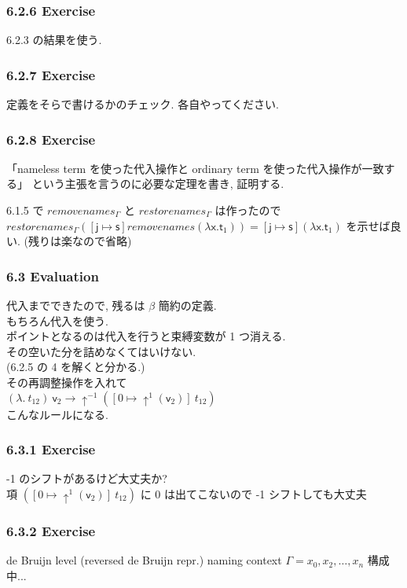\documentclass[13pt,dvipdfm]{beamer}
\begin{document}
\frame
{
  \frametitle{6.2.6 Exercise}
  6.2.3 の結果を使う.
}

\frame
{
  \frametitle{6.2.7 Exercise}
  定義をそらで書けるかのチェック.
  各自やってください.
}

\frame
{
  \frametitle{6.2.8 Exercise}
  「nameless term を使った代入操作と ordinary term を使った代入操作が一致する」
  という主張を言うのに必要な定理を書き, 証明する.

  6.1.5 で $removenames_{\Gamma}$ と $restorenames_{\Gamma}$ は作ったので \\
  $restorenames_{\Gamma}([\mathsf{j} \mapsto \mathsf{s}] removenames(\lambda \mathsf{x}. \mathsf{t}_1)) = [\mathsf{j} \mapsto \mathsf{s}] (\lambda \mathsf{x}. \mathsf{t}_1)$
  を示せば良い. (残りは楽なので省略)
}

\frame
{
  \frametitle{6.3 Evaluation}
  代入までできたので, 残るは $\beta$ 簡約の定義.\\
  もちろん代入を使う.\\
  ポイントとなるのは代入を行うと束縛変数が 1 つ消える.\\
  その空いた分を詰めなくてはいけない.\\
  (6.2.5 の 4 を解くと分かる.)\\
  その再調整操作を入れて\\
  $(\lambda.\ t_{12})\ \mathsf{v}_2 \longrightarrow \uparrow^{-1} ([0 \mapsto \uparrow^{1} (\mathsf{v}_2)]\ t_{12})$\\
  こんなルールになる.
}

\frame
{
  \frametitle{6.3.1 Exercise}
  -1 のシフトがあるけど大丈夫か?\\
  項 $([0 \mapsto \uparrow^{1} (\mathsf{v}_2)]\ t_{12})$ に 0 は出てこないので -1 シフトしても大丈夫
}

\frame
{
  \frametitle{6.3.2 Exercise}
  de Bruijn level (reversed de Bruijn repr.)
  naming context $\Gamma = x_0, x_2,\dots,x_n$
  構成中...
}
\end{document}
